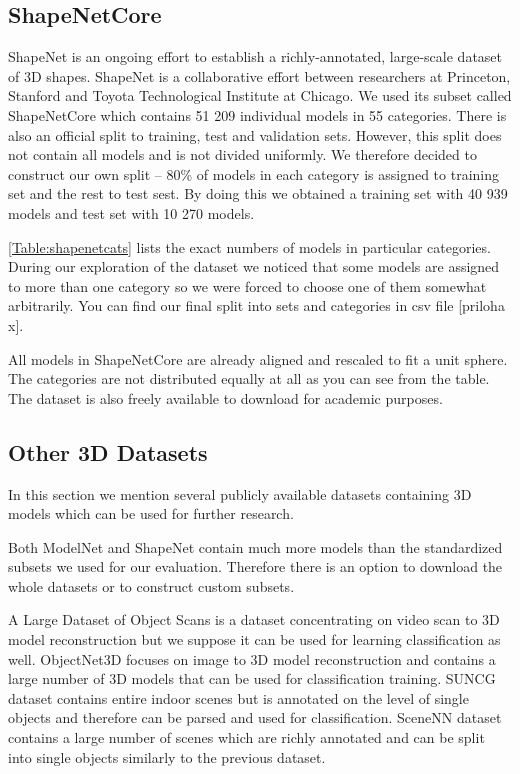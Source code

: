 \subsection{ShapeNetCore}
ShapeNet \cite{chang_shapenet:_2015} is an ongoing effort to establish a richly-annotated, large-scale dataset of 3D shapes. ShapeNet is a collaborative effort between researchers at Princeton, Stanford and Toyota Technological Institute at Chicago. We used its subset called ShapeNetCore which contains 51 209 individual models in 55 categories. There is also an official split to training, test and validation sets. However, this split does not contain all models and is not divided uniformly. We therefore decided to construct our own split -- 80\% of models in each category is assigned to training set and the rest to test sest. By doing this we obtained a training set with 40 939 models and test set with 10 270 models. \par \autoref{Table:shapenetcats} lists the exact numbers of models in particular categories. During our exploration of the dataset we noticed that some models are assigned to more than one category so we were forced to choose one of them somewhat arbitrarily. You can find our final split into sets and categories in csv file [priloha x].  \par
All models in ShapeNetCore are already aligned and rescaled to fit a unit sphere. The categories are not distributed equally at all as you can see from the table. The dataset is also freely available to download for academic purposes.




\subsection{Other 3D Datasets}
In this section we mention several publicly available datasets containing 3D models which can be used for further research. \par
Both ModelNet and ShapeNet contain much more models than the standardized subsets we used for our evaluation. Therefore there is an option to download the whole datasets or to construct custom subsets. \par
A Large Dataset of Object Scans \cite{choi_large_2016} is a dataset concentrating on video scan to 3D model reconstruction but we suppose it can be used for learning classification as well. 
ObjectNet3D \cite{xiang_objectnet3d:_2016} focuses on image to 3D model reconstruction and contains a large number of 3D models that can be used for classification training.
SUNCG dataset \cite{song_semantic_2017} contains entire indoor scenes but is annotated on the level of single objects and therefore can be parsed and used for classification. 
SceneNN \cite{hua_scenenn:_2016} dataset contains a large number of scenes which are richly annotated and can be split into single objects similarly to the previous dataset.


